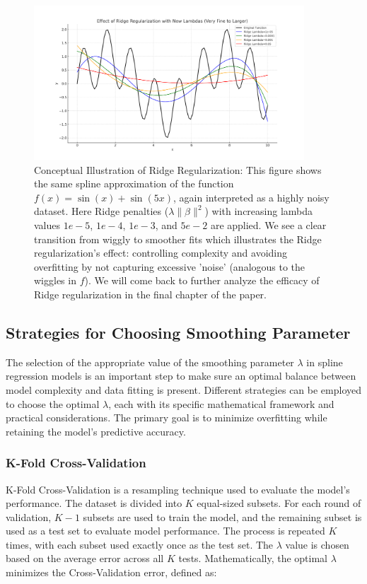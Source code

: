 \documentclass[12pt, twoside,hidelinks]{article}
\theoremstyle{definition}
\numberwithin{equation}{section}
\begin{document}
\begin{figure}[H]
\centering
\includegraphics[width=0.9\textwidth]{visuals/Theory/ridge_regularization_new_lambdas.png}
\caption[Conceptual Illustration of Ridge Regularization]{Conceptual Illustration of Ridge Regularization: This figure shows the same spline approximation of the function \(f(x) = \sin(x) + \sin(5x)\), again interpreted as a highly noisy dataset. Here  Ridge penalties (\( \lambda \|\beta\|^2 \)) with increasing lambda values \(1e-5\), \(1e-4\), \(1e-3\), and \(5e-2\) are applied. We see a clear transition from wiggly to smoother fits which illustrates the Ridge regularization's effect: controlling complexity and avoiding overfitting by not capturing excessive 'noise' (analogous to the wiggles in \(f\)). We will come back to further analyze the efficacy of Ridge regularization in the final chapter of the paper.}
\end{figure}

\subsection{Strategies for Choosing Smoothing Parameter}\label{sec:smooth:lambda}

The selection of the appropriate value of the smoothing parameter \(\lambda\) in spline regression models is an important step to make sure an optimal balance between model complexity and data fitting is present. Different strategies can be employed to choose the optimal \(\lambda\), each with its specific mathematical framework and practical considerations. The primary goal is to minimize overfitting while retaining the model's predictive accuracy.

\subsubsection{K-Fold Cross-Validation}\label{sec:smooth:lambda:kfold}
K-Fold Cross-Validation is a resampling technique used to evaluate the model's performance. The dataset is divided into \(K\) equal-sized subsets. For each round of validation, \(K-1\) subsets are used to train the model, and the remaining subset is used as a test set to evaluate model performance. The process is repeated \(K\) times, with each subset used exactly once as the test set. The \(\lambda\) value is chosen based on the average error across all \(K\) tests. Mathematically, the optimal \(\lambda\) minimizes the Cross-Validation error, defined as:
\end{document}

